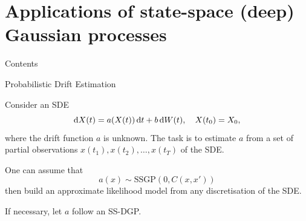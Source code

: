 \documentclass[seriffont, cmap=Beijing, 10pt]{zz}
\begin{document}

\section{Applications of state-space (deep) Gaussian processes}
\begin{frame}{Contents}
	\begin{block}{}
		\tableofcontents[currentsection]
	\end{block}
\end{frame}

\begin{frame}{Probabilistic Drift Estimation}
	\begin{block}{}
		Consider an SDE
		\begin{equation}
			\mathop{}\!\mathrm{d} X(t) = a(X(t)) \mathop{}\!\mathrm{d} t + b \mathop{}\!\mathrm{d} W(t), \quad X(t_0) = X_0,
		\end{equation}
		where the drift function $a$ is \alert{unknown}. The task is to estimate $a$ from a set of partial observations \alert{$x(t_1), x(t_2), \ldots, x(t_T)$} of the SDE.
	\end{block}
	\begin{block}{}
		One can assume that
		\begin{equation}
			a(x) \sim \mathrm{SSGP}(0, C(x, x'))
		\end{equation}
		then build an \alert{approximate likelihood} model from any \alert{discretisation} of the SDE.
	\end{block}
	\begin{block}{}
		If necessary, let $a$ follow an SS-DGP.
	\end{block}
\end{frame}
\end{document}
